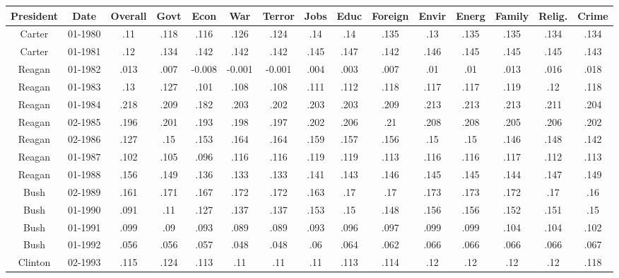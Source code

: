 \begin{sidewaystable}
\begin{singlespace}
\begin{center}
 \begin{tabular}{||c c c c c c c c c c c c c c c||}
 \hline
 President & Date & Overall & Govt & Econ & War & Terror & Jobs & Educ & Foreign & Envir & Energ & Family & Relig. & Crime \\
 \hline\hline
Carter & 01-1980 & .11 & .118 & .116 & .126 & .124 & .14 & .14 & .135 & .13 & .135 & .135 & .134 & .134 \\ 
\hline
Carter & 01-1981 & .12 & .134 & .142 & .142 & .142 & .145 & .147 & .142 & .146 & .145 & .145 & .145 & .143 \\ 
\hline
Reagan & 01-1982 & .013 & .007 & -0.008 & -0.001 & -0.001 & .004 & .003 & .007 & .01 & .01 & .013 & .016 & .018 \\ 
\hline
Reagan & 01-1983 & .13 & .127 & .101 & .108 & .108 & .111 & .112 & .118 & .117 & .117 & .119 & .12 & .118 \\ 
\hline
Reagan & 01-1984 & .218 & .209 & .182 & .203 & .202 & .203 & .203 & .209 & .213 & .213 & .213 & .211 & .204 \\ 
\hline
Reagan & 02-1985 & .196 & .201 & .193 & .198 & .197 & .202 & .206 & .21 & .208 & .208 & .205 & .206 & .202 \\ 
\hline
Reagan & 02-1986 & .127 & .15 & .153 & .164 & .164 & .159 & .157 & .156 & .15 & .15 & .146 & .148 & .142 \\ 
\hline
Reagan & 01-1987 & .102 & .105 & .096 & .116 & .116 & .119 & .119 & .113 & .116 & .116 & .117 & .112 & .113 \\ 
\hline
Reagan & 01-1988 & .156 & .149 & .136 & .133 & .133 & .141 & .143 & .146 & .145 & .145 & .144 & .147 & .149 \\ 
\hline
Bush & 02-1989 & .161 & .171 & .167 & .172 & .172 & .163 & .17 & .17 & .173 & .173 & .172 & .17 & .16 \\ 
\hline
Bush & 01-1990 & .091 & .11 & .127 & .137 & .137 & .153 & .15 & .148 & .156 & .156 & .152 & .151 & .15 \\ 
\hline
Bush & 01-1991 & .099 & .09 & .093 & .089 & .089 & .093 & .096 & .097 & .099 & .099 & .104 & .104 & .102 \\ 
\hline
Bush & 01-1992 & .056 & .056 & .057 & .048 & .048 & .06 & .064 & .062 & .066 & .066 & .066 & .066 & .067 \\ 
\hline
Clinton & 02-1993 & .115 & .124 & .113 & .11 & .11 & .11 & .113 & .114 & .12 & .12 & .12 & .12 & .118 \\ 

\end{tabular}
\end{center}
\end{singlespace}
\end{sidewaystable}
